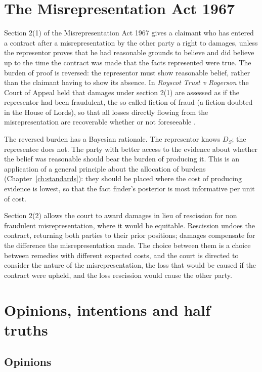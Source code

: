 \section{The Misrepresentation Act 1967}

Section 2(1) of the Misrepresentation Act 1967 gives a claimant who has entered a contract after a misrepresentation by the other party a right to damages, unless the representor proves that he had reasonable grounds to believe and did believe up to the time the contract was made that the facts represented were true. The burden of proof is reversed: the representor must show reasonable belief, rather than the claimant having to show its absence. In \emph{Royscot Trust v Rogerson} the Court of Appeal held that damages under section 2(1) are assessed as if the representor had been fraudulent, the so called fiction of fraud (a fiction doubted in the House of Lords), so that all losses directly flowing from the misrepresentation are recoverable whether or not foreseeable \citep{royscot1991}.

The reversed burden has a Bayesian rationale. The representor knows $D_S$; the representee does not. The party with better access to the evidence about whether the belief was reasonable should bear the burden of producing it. This is an application of a general principle about the allocation of burdens (Chapter~\ref{ch:standards}): they should be placed where the cost of producing evidence is lowest, so that the fact finder's posterior is most informative per unit of cost.

Section 2(2) allows the court to award damages in lieu of rescission for non fraudulent misrepresentation, where it would be equitable. Rescission undoes the contract, returning both parties to their prior positions; damages compensate for the difference the misrepresentation made. The choice between them is a choice between remedies with different expected costs, and the court is directed to consider the nature of the misrepresentation, the loss that would be caused if the contract were upheld, and the loss rescission would cause the other party.

\section{Opinions, intentions and half truths}

\subsection{Opinions}

